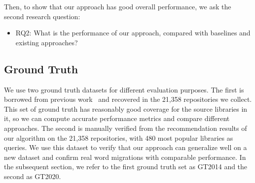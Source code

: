 \documentclass[conference, 10pt]{IEEEtran}
\begin{document}
Then, to show that our approach has good overall performance, %
we 
ask the second research question:
\begin{itemize}
    \item RQ2: What is the performance of our approach, %
    compared with baselines and existing approaches?
\end{itemize}


\subsection{Ground Truth} %
\label{subsec:ground-truth}

We use two ground truth datasets for different evaluation purposes. 
The first is borrowed from previous work~\cite{2014JournalOfSysAndSoft-Teyton-Study} and recovered in the 21,358 repositories we collect.
This set of ground truth has reasonably good coverage for the source libraries in it, so we can compute accurate performance metrics and compare different approaches.
The second is manually verified from the recommendation results of our algorithm on the 21,358 repositories, with 480 most popular libraries as queries. 
We use this dataset to verify that our approach can generalize well on a new dataset and confirm real word migrations with comparable performance.
In the subsequent section, we refer to the first ground truth set as GT2014 and the second as GT2020.
\end{document}
